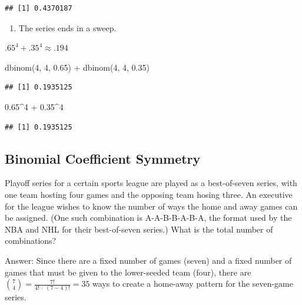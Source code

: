 \documentclass[
  11pt,
]{book}
\newenvironment{Shaded}{\begin{snugshade}}{\end{snugshade}}
\newcommand{\DecValTok}[1]{\textcolor[rgb]{0.00,0.00,0.81}{#1}}
\newcommand{\FloatTok}[1]{\textcolor[rgb]{0.00,0.00,0.81}{#1}}
\newcommand{\FunctionTok}[1]{\textcolor[rgb]{0.00,0.00,0.00}{#1}}
\newcommand{\NormalTok}[1]{#1}
\newcommand{\SpecialCharTok}[1]{\textcolor[rgb]{0.00,0.00,0.00}{#1}}
\providecommand{\tightlist}{%
  \setlength{\itemsep}{0pt}\setlength{\parskip}{0pt}}
\theoremstyle{definition}
\theoremstyle{definition}
\theoremstyle{definition}
\theoremstyle{definition}
\theoremstyle{remark}
\begin{document}
\begin{verbatim}
## [1] 0.4370187
\end{verbatim}

\begin{enumerate}
\def\labelenumi{(\alph{enumi})}
\setcounter{enumi}{3}
\tightlist
\item
  The series ends in a sweep.
\end{enumerate}

\(.65^4 + .35^4 \approx .194\)

\begin{Shaded}
\begin{Highlighting}[]
\FunctionTok{dbinom}\NormalTok{(}\DecValTok{4}\NormalTok{, }\DecValTok{4}\NormalTok{, }\FloatTok{0.65}\NormalTok{) }\SpecialCharTok{+} \FunctionTok{dbinom}\NormalTok{(}\DecValTok{4}\NormalTok{, }\DecValTok{4}\NormalTok{, }\FloatTok{0.35}\NormalTok{)}
\end{Highlighting}
\end{Shaded}

\begin{verbatim}
## [1] 0.1935125
\end{verbatim}

\begin{Shaded}
\begin{Highlighting}[]
\FloatTok{0.65}\SpecialCharTok{\^{}}\DecValTok{4} \SpecialCharTok{+} \FloatTok{0.35}\SpecialCharTok{\^{}}\DecValTok{4}
\end{Highlighting}
\end{Shaded}

\begin{verbatim}
## [1] 0.1935125
\end{verbatim}

\hypertarget{binomial-coefficient-symmetry}{%
\subsection{Binomial Coefficient Symmetry}\label{binomial-coefficient-symmetry}}

Playoff series for a certain sports league are played as a best-of-seven series, with one team hosting four games and the opposing team hosing three. An executive for the league wishes to know the number of ways the home and away games can be assigned. (One such combination is A-A-B-B-A-B-A, the format used by the NBA and NHL for their best-of-seven series.) What is the total number of combinations?

Answer: Since there are a fixed number of games (seven) and a fixed number of games that must be given to the lower-seeded team (four), there are \(\binom{7}{4} = \frac{7!}{4!\ \cdot\ (7-4)!} = 35\) ways to create a home-away pattern for the seven-game series.
\end{document}
